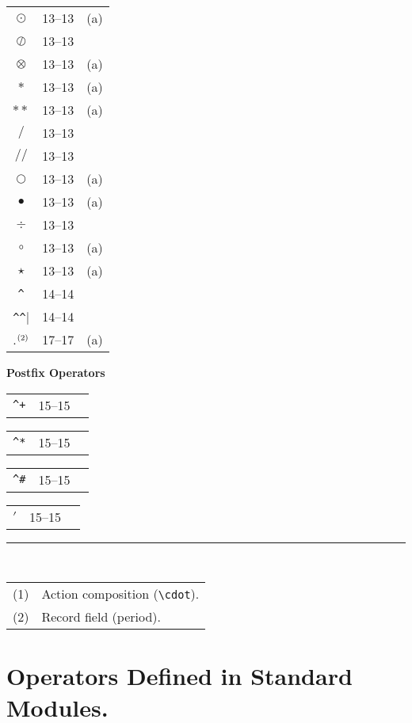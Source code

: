 \documentclass[fleqn,leqno]{article}
\newcommand{\notemark}[1]{$^{\mbox{\tiny(#1)}}$}
\begin{document}
{\begin{tabular}[t]{@{}cl@{\,}l}
$\odot$ & 13--13  & \small(a)  \\
$\oslash$ & 13--13    & \\
$\otimes$ & 13--13     & \small(a) \\
$*$ & 13--13     & \small(a) \\
$**$ & 13--13     & \small(a) \\
$/$ & 13--13      & \\
$//$ & 13--13      & \\
$\bigcirc$ & 13--13     & \small(a) \\
$\bullet$ & 13--13     & \small(a) \\
$\div$ & 13--13      & \\
$\circ$ & 13--13     & \small(a) \\
$\star$ & 13--13     & \small(a) \\
\verb|^| & 14--14  & \\ 
\verb|^^| & 14--14 & \\
.\notemark{2} & 17--17 & \small(a)
\end{tabular}%

\vspace{1.8\baselineskip}

\textbf{Postfix Operators}
\vspace{.2\baselineskip}

\begin{tabular}[t]{@{}cl@{\,}l}
\verb|^+| & 15--15
\end{tabular}%
%
\begin{tabular}[t]{@{}cl@{\,}l}
\verb|^*|& 15--15
\end{tabular}%
%
\begin{tabular}[t]{@{}cl@{\,}l}
\verb|^#| & 15--15
\end{tabular}%
%
\begin{tabular}[t]{@{}cl@{\,}l}
$'$ & 15--15
\end{tabular}

\raggedright

\rule{.2\textwidth}{.4pt}\\
{\footnotesize\begin{tabular}[t]{@{}l@{\ }l}
  (1)& Action composition (\verb|\cdot|).\\[.1em]
  (2)& Record field (period).
\end{tabular}}
 
}

\newpage
\section*{Operators Defined in Standard Modules.}
\end{document}
